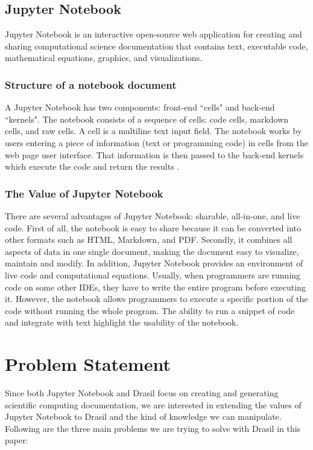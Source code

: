 \subsection{Jupyter Notebook}
Jupyter Notebook is an interactive open-source web application for creating and 
sharing computational science documentation that contains text, executable 
code, mathematical equations, graphics, and visualizations.

\subsubsection{Structure of a notebook document}
A Jupyter Notebook has two components: front-end ``cells" and back-end 
``kernels". The notebook consists of a sequence of cells: code cells, markdown 
cells, and raw cells. A cell is a multiline text input field. The notebook 
works by users entering a piece of information (text or programming code) in 
cells from the web page user interface. That information is then passed to the 
back-end kernels which execute the code and return the results 
\cite{notebookdoc}.

\subsubsection{The Value of Jupyter Notebook}
There are several advantages of Jupyter Notebook: sharable, all-in-one, and 
live code. First of all, the notebook is easy to share because it can be 
converted into other formats such as HTML, Markdown, and PDF. Secondly, it 
combines all aspects of data in one single document, making the document easy 
to visualize, maintain and modify. In addition, Jupyter Notebook provides an 
environment of live code and computational equations. Usually, when programmers 
are running code on some other IDEs, they have to write the entire program 
before executing it. However, the notebook allows programmers to execute a 
specific portion of the code without running the whole program. The ability to 
run a snippet of code and integrate with text highlight the usability of the 
notebook.

\section{Problem Statement}
Since both Jupyter Notebook and Drasil focus on creating and generating 
scientific computing documentation, we are interested in extending the values 
of Jupyter Notebook to Drasil and the kind of knowledge we can manipulate. 
Following are the three main problems we are trying to solve with Drasil in 
this paper:

